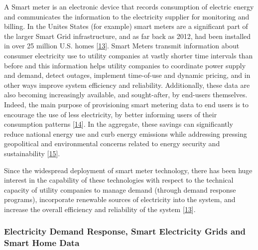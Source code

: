 \documentclass[11pt,]{article}
\begin{document}
A Smart meter is an electronic device that records consumption of
electric energy and communicates the information to the electricity
supplier for monitoring and billing. In the Unites States (for example)
smart meters are a significant part of the larger Smart Grid
infrastructure, and as far back as 2012, had been installed in over 25
million U.S. homes
{[}\protect\hyperlink{ref-hornePrivacyTechnologyNorms2015}{13}{]}. Smart
Meters transmit information about consumer electricity use to utility
companies at vastly shorter time intervals than before and this
information helps utility companies to coordinate power supply and
demand, detect outages, implement time-of-use and dynamic pricing, and
in other ways improve system efficiency and reliability. Additionally,
these data are also becoming increasingly available, and sought-after,
by end-users themselves. Indeed, the main purpose of provisioning smart
metering data to end users is to encourage the use of less electricity,
by better informing users of their consumption patterns
{[}\protect\hyperlink{ref-jui-shengchouCloudForecastingSystem2019}{14}{]}.
In the aggregate, these savings can significantly reduce national energy
use and curb energy emissions while addressing pressing geopolitical and
environmental concerns related to energy security and sustainability
{[}\protect\hyperlink{ref-graabSmartGridSmart2011}{15}{]}.

Since the widespread deployment of smart meter technology, there has
been huge interest in the capability of these technologies with respect
to the technical capacity of utility companies to manage demand (through
demand response programs), incorporate renewable sources of electricity
into the system, and increase the overall efficiency and reliability of
the system
{[}\protect\hyperlink{ref-hornePrivacyTechnologyNorms2015}{13}{]}.

\hypertarget{electricity-demand-response-smart-electricity-grids-and-smart-home-data}{%
\subsubsection{Electricity Demand Response, Smart Electricity Grids and
Smart Home
Data}\label{electricity-demand-response-smart-electricity-grids-and-smart-home-data}}
\end{document}
